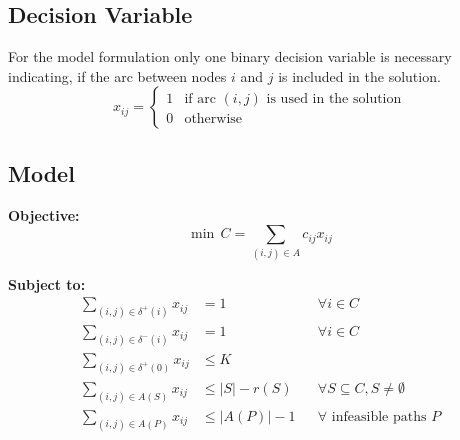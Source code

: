 \subsection*{Decision Variable}
For the model formulation only one binary decision variable is necessary indicating, if the arc
between nodes $i$ and $j$ is included in the solution.
\[
    x_{ij} =
    \begin{cases}
        1 & \text{if arc } (i,j) \text{ is used in the solution} \\
        0 & \text{otherwise}
    \end{cases}
\]
\clearpage

\subsection*{Model}
\textbf{Objective:}
\begin{equation}
    \label{eq:objective}
    \min \, C = \sum_{(i,j)\in A} c_{ij}x_{ij}
\end{equation}

\textbf{Subject to:}
\begin{align}
    \sum_{(i,j)\in \delta^+(i)} x_{ij} & = 1                                                                                  &  & \forall i \in C                         \label{eq:flowout}     \\
    \sum_{(i,j)\in \delta^-(i)} x_{ij} & = 1                                                                                  &  & \forall i \in C                         \label{eq:flowin}      \\
    \sum_{(i,j)\in \delta^+(0)} x_{ij} & \leq K                                                       \label{eq:vehiclelimit}                                                                     \\
    \sum_{(i,j)\in A(S)} x_{ij}        & \leq |S| - r(S)                                                                      &  & \forall S \subseteq C, S \neq \emptyset \label{eq:capacitycut} \\
    \sum_{(i,j)\in A(P)} x_{ij}        & \leq |A(P)| - 1                                                                      &  & \forall \text{ infeasible paths } P     \label{eq:pathelim}
\end{align}

